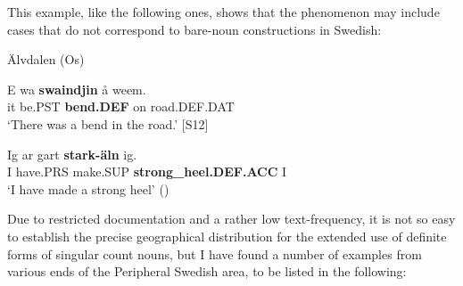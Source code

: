 \z

This example, like the following ones, shows that the phenomenon may include cases that do not correspond to bare-noun constructions in Swedish: 


\item 

Älvdalen (Os)



\item 


 \ea\label{}
\gll E  wa  \textbf{swaindjin} å  weem.\\


it  be.PST  \textbf{bend.DEF} on  road.DEF.DAT\\

\glt ‘There was a bend in the road.’ [S12]

\z

\item 


 \ea\label{}
\gll Ig  ar  gart  \textbf{stark-äln} ig.\\


I   have.PRS  make.SUP  \textbf{strong\_heel.DEF.ACC} I\\

\glt ‘I have made a strong heel’ (\citet[95]{Levander1909})

\z

Due to restricted documentation and a rather low text-frequency, it is not so easy to establish the precise geographical distribution for the extended use of definite forms of singular count nouns, but I have found a number of examples from various ends of the Peripheral Swedish area, to be listed in the following: 

